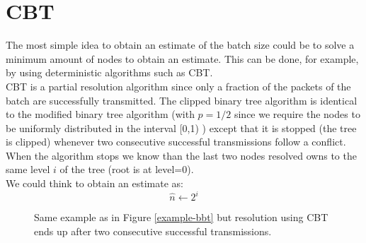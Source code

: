 \documentclass[12pt,a4paper,twocolumns]{report}
\begin{document}
\section{CBT}
\label{cbt-estimation}
The most simple idea to obtain an estimate of the batch size could be to solve a minimum amount of nodes to obtain an estimate. This can be done, for example, by using deterministic algorithms such as CBT.\\
CBT is a partial resolution algorithm since only a fraction of the packets of the batch are successfully transmitted.
The clipped binary tree algorithm is identical to the modified binary tree algorithm (with $p=1/2$ since we require the nodes to be uniformly distributed in the interval [0,1) ) except that it is stopped (the tree is clipped) whenever two consecutive successful transmissions follow a conflict.\\
When the algorithm stops we know than the last two nodes resolved owns to the same level $i$ of the tree (root is at level=0).\\
We could think to obtain an estimate as:
\begin{equation}
\hat{n}\gets2^{i}
\end{equation}

\begin{figure}[H]
\centering
{}
\caption[CBT example]{ Same example as in Figure \ref{example-bbt} but resolution using CBT ends up after two consecutive successful transmissions.}
\end{figure}
\end{document}
